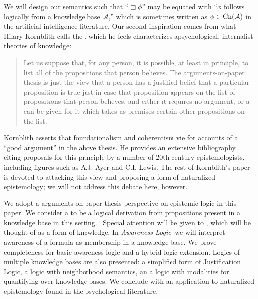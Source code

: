 \begin{quote}
  {}
\end{quote}

We will design our semantics such that ``$\Box \phi$'' may be equated with
``$\phi$ follows logically from a knowledge base $\mathcal{A}$,'' which is
sometimes written as $\phi \in \operatorname{Cn} ( \mathcal{A})$ in the artificial
intelligence literature.  Our second inspiration comes from what Hilary
Kornblith calls the 
{\cite{kornblith_beyond_1980}}, which he feels characterizes apsychological,
internalist theories of knowledge:

\begin{quote}
  Let us suppose that, for any person, it is possible, at least in principle,
  to list all of the propositions that person believes.  The
  arguments-on-paper thesis is just the view that a person has a justified
  belief that a particular proposition is true just in case that proposition
  appears on the list of propositions that person believes, and either it
  requires no argument, or a {} can be given for it which
  takes as premises certain other propositions on the list.
\end{quote}

Kornblith asserts that foundationalism and coherentism vie for accounts of a
``good argument'' in the above thesis.  He provides an extensive bibliography
citing proposals for this principle by a number of 20th century
epistemologists, including figures such as A.J. Ayer and C.I. Lewis.  The
rest of Kornblith's paper is devoted to attacking this view and proposing a
form of naturalized epistemology; we will not address this debate here,
however.



We adopt a arguments-on-paper-thesis perspective on epistemic logic in this
paper.  We consider a  to be a logical derivation
from propositions present in a knowledge base in this setting.  \
Special attention will be given to , which will be
thought of as a form of knowledge.  In \emph{Awareness Logic}, we will interpret
awareness of a formula as membership in a knowledge base.  We prove
completeness for basic awareness logic and a hybrid logic extension.  Logics
of multiple knowledge bases are also presented: a simplified form of
Justification Logic, a logic with neighborhood semantics, an a logic with
modalities for quantifying over knowledge bases.  We conclude with an
application to naturalized epistemology found in the psychological
literature.
